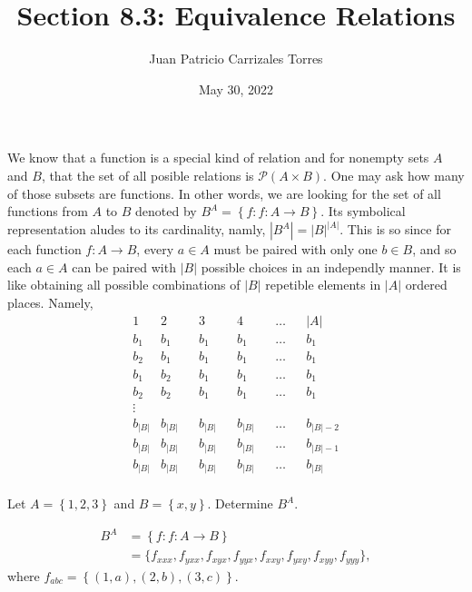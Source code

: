 \documentclass[12pt]{article}
\newenvironment{problem}[2][Problem]{\begin{trivlist} \item[\hskip \labelsep {\bfseries #1}\hskip \labelsep {\bfseries #2.}]}{\end{trivlist}}
\newenvironment{solution}[1][Solution]{\begin{trivlist} \item[\hskip \labelsep {\bfseries #1}]}{\end{trivlist}}
\begin{document}
  
 \title{Section 8.3: Equivalence Relations}
   \author{Juan Patricio Carrizales Torres}
     \date{May 30, 2022}
       \maketitle

       We know that a function is a special kind of relation and for nonempty sets $A$ and $B$, that the set of all posible relations is $\mathcal{P}(A\times B)$. One may ask how many of those subsets are functions. In other words, we are looking for the set of all functions from $A$ to $B$ denoted by $B^{A}=\left\{ f:f:A\to B \right\}$. Its symbolical representation aludes to its cardinality, namly, $|B^{A}| = |B|^{|A|}$.
       This is so since for each function $f:A\to B$, every $a\in A$ must be paired with only one $b\in B$, and so each $a\in A$ can be paired with $|B|$ possible choices in an independly manner. It is like obtaining all possible combinations of $|B|$ repetible elements in $|A|$ ordered places. Namely,
    \begin{align*}
      &1 &2& &3& &4& &\dots& &|A|&\\
      &b_{1} &b_{1}& &b_{1}& &b_{1}& &\dots& &b_{1}\\
      &b_{2} &b_{1}& &b_{1}& &b_{1}& &\dots& &b_{1}\\
      &b_{1} &b_{2}& &b_{1}& &b_{1}& &\dots& &b_{1}\\
      &b_{2} &b_{2}& &b_{1}& &b_{1}& &\dots& &b_{1}\\
      &\vdots\\
      &b_{|B|} &b_{|B|}& &b_{|B|}& &b_{|B|}& &\dots& &b_{|B|-2}\\
      &b_{|B|} &b_{|B|}& &b_{|B|}& &b_{|B|}& &\dots& &b_{|B|-1}\\
      &b_{|B|} &b_{|B|}& &b_{|B|}& &b_{|B|}& &\dots& &b_{|B|}\\
    \end{align*}
    \begin{problem}{13}
      Let $A=\left\{ 1,2,3 \right\}$ and $B=\left\{ x,y \right\}$. Determine $B^{A}$.
    \begin{solution}
    \begin{align*}
      B^{A} &= \left\{ f:f:A\to B \right\}\\
      &= \{f_{xxx},f_{yxx}, f_{xyx}, f_{yyx}, f_{xxy}, f_{yxy}, f_{xyy},f_{yyy}\},
    \end{align*}
    where $f_{abc} = \left\{ (1,a),(2,b),(3,c) \right\}$.
    \end{solution}
    \end{problem}
\end{document}
